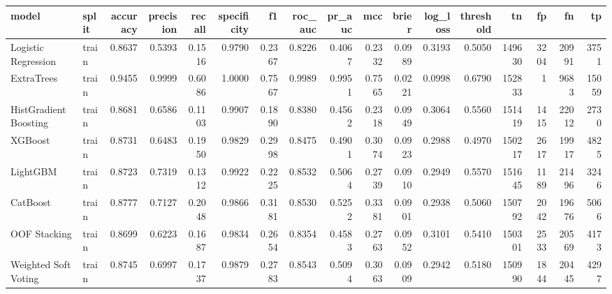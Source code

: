 \begin{tabular}{llrrrrrrrrrrrrrrr}
\toprule
model & split & accuracy & precision & recall & specificity & f1 & roc\_auc & pr\_auc & mcc & brier & log\_loss & threshold & tn & fp & fn & tp \\
\midrule
Logistic Regression & train & 0.8637 & 0.5393 & 0.1516 & 0.9790 & 0.2367 & 0.8226 & 0.4067 & 0.2332 & 0.0989 & 0.3193 & 0.5050 & 149630 & 3204 & 20991 & 3751 \\
ExtraTrees & train & 0.9455 & 0.9999 & 0.6086 & 1.0000 & 0.7567 & 0.9989 & 0.9951 & 0.7565 & 0.0221 & 0.0998 & 0.6790 & 152833 & 1 & 9683 & 15059 \\
HistGradientBoosting & train & 0.8681 & 0.6586 & 0.1103 & 0.9907 & 0.1890 & 0.8380 & 0.4562 & 0.2318 & 0.0949 & 0.3064 & 0.5560 & 151419 & 1415 & 22012 & 2730 \\
XGBoost & train & 0.8731 & 0.6483 & 0.1950 & 0.9829 & 0.2998 & 0.8475 & 0.4901 & 0.3074 & 0.0923 & 0.2988 & 0.4970 & 150217 & 2617 & 19917 & 4825 \\
LightGBM & train & 0.8723 & 0.7319 & 0.1312 & 0.9922 & 0.2225 & 0.8532 & 0.5064 & 0.2739 & 0.0910 & 0.2949 & 0.5570 & 151645 & 1189 & 21496 & 3246 \\
CatBoost & train & 0.8777 & 0.7127 & 0.2048 & 0.9866 & 0.3181 & 0.8530 & 0.5252 & 0.3381 & 0.0901 & 0.2938 & 0.5060 & 150792 & 2042 & 19676 & 5066 \\
OOF Stacking & train & 0.8699 & 0.6223 & 0.1687 & 0.9834 & 0.2654 & 0.8354 & 0.4583 & 0.2763 & 0.0952 & 0.3101 & 0.5410 & 150301 & 2533 & 20569 & 4173 \\
Weighted Soft Voting & train & 0.8745 & 0.6997 & 0.1737 & 0.9879 & 0.2783 & 0.8543 & 0.5094 & 0.3063 & 0.0909 & 0.2942 & 0.5180 & 150990 & 1844 & 20445 & 4297 \\
\bottomrule
\end{tabular}
